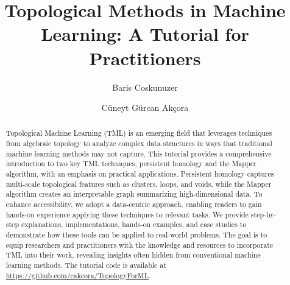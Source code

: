\documentclass[manuscript,screen]{acmart}
\begin{document}
\title{Topological Methods in Machine Learning: A Tutorial for Practitioners}


\author{Baris Coskunuzer}
\author{C\"{u}neyt G\"{u}rcan Ak\c{c}ora}


\renewcommand{\shortauthors}{Coskunuzer-Akcora}


\begin{abstract}
Topological Machine Learning (TML) is an emerging field that leverages techniques from algebraic topology to analyze complex data structures in ways that traditional machine learning methods may not capture. This tutorial provides a comprehensive introduction to two key TML techniques, persistent homology and the Mapper algorithm, with an emphasis on practical applications. Persistent homology captures multi-scale topological features such as clusters, loops, and voids, while the Mapper algorithm creates an interpretable graph summarizing high-dimensional data. To enhance accessibility, we adopt a data-centric approach, enabling readers to gain hands-on experience applying these techniques to relevant tasks. We provide step-by-step explanations, implementations, hands-on examples, and case studies to demonstrate how these tools can be applied to real-world problems. The goal is to equip researchers and practitioners with the knowledge and resources to incorporate TML into their work, revealing insights often hidden from conventional machine learning methods. The tutorial code is available at \url{https://github.com/cakcora/TopologyForML}.
\end{abstract}

 
\end{document}
